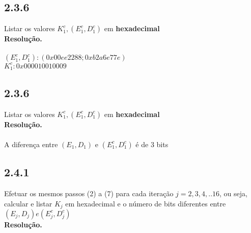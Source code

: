 \documentclass[12pt,letterpaper]{article}
\newcommand\answer{\textbf{Resolução.}\xspace}
\begin{document}
\subsection*{2.3.6}
Listar os valores $K_1^c, (E_1^c, D_1^c)$ em \textbf{hexadecimal} \\
\answer \\ \\
$(E_1^c, D_1^c): (0x00ee2288; 0xb2a6e77e)$ \\
$K_1^c  : 0x000010010009$

\subsection*{2.3.6}
Listar os valores $K_1^c, (E_1^c, D_1^c)$ em \textbf{hexadecimal} \\
\answer \\ \\
A diferença entre $(E_1, D_1)$ e $(E_1^c, D_1^c)$ é de 3 bits

\subsection*{2.4.1}
Efetuar os mesmos passos (2) a (7) para cada iteração $j = 2,3,4,..16$, ou seja, calcular e listar $K_j$ em hexadecimal e o número de bits diferentes entre $(E_j,D_j)e (E_j^c,D_j^c)$ \\
\answer
\end{document}
